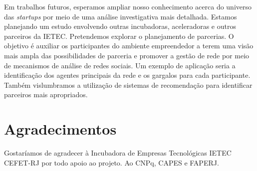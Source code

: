 \documentclass{sig-alternate-05-2015}
\begin{document}
Em trabalhos futuros, esperamos ampliar nosso conhecimento acerca do universo das \textit{startups} por meio de uma análise investigativa mais detalhada. Estamos planejando um estudo envolvendo outras incubadoras, aceleradoras e outros parceiros da IETEC. Pretendemos explorar o planejamento de parcerias. O objetivo é auxiliar os participantes do ambiente empreendedor a terem uma visão mais ampla das possibilidades de parceria e promover a gestão de rede por meio de mecanismos de análise de redes sociais. Um exemplo de aplicação seria a identificação dos agentes principais da rede e os gargalos para cada participante. Também vislumbramos a utilização de sistemas de recomendação para identificar parceiros mais apropriados.


\section{Agradecimentos}
Gostaríamos de agradecer à Incubadora de Empresas Tecnológicas IETEC CEFET-RJ por todo apoio ao projeto. Ao CNPq, CAPES e FAPERJ.

%

%
%
\end{document}
